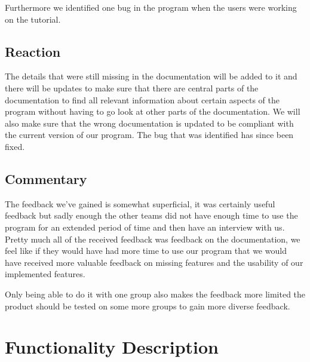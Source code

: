 \documentclass[11pt]{article}
\begin{document}
Furthermore we identified one bug in the program when the users were working on the tutorial. 
\subsection{Reaction}
The details that were still missing in the documentation will be added to it and there will be updates to make sure that there are central parts of the documentation to find all relevant information about certain aspects of the program without having to go look at other parts of the documentation. We will also make sure that the wrong documentation is updated to be compliant with the current version of our program. The bug that was identified has since been fixed.

\subsection{Commentary}
The feedback we've gained is somewhat superficial, it was certainly useful feedback but sadly enough the other teams did not have enough time to use the program for an extended period of time and then have an interview with us. Pretty much all of the received feedback was feedback on the documentation, we feel like if they would have had more time to use our program that we would have received more valuable feedback on missing features and the usability of our implemented features.

Only being able to do it with one group also makes the feedback more limited the product should be tested on some more groups to gain more diverse feedback.

\clearpage


\section{Functionality Description}
\end{document}
